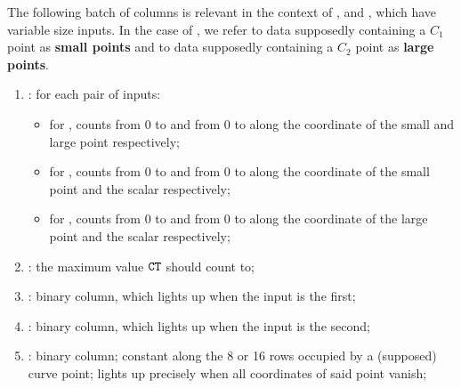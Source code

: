 The following batch of columns is relevant in the context of ,  and , which have variable size inputs.
In the case of , we refer to data supposedly containing a $C_1$ point as \textbf{small points} and to data supposedly containing a $C_2$ point as \textbf{large points}.
\begin{enumerate}[resume]
      \item \ct:
            for each pair of inputs:
            \begin{itemize}
                  \item for , counts from 0 to \ctMaxSmallPoint{} and from 0 to \ctMaxLargePoint{} along the coordinate of the small and large point respectively;
                  \item for , counts from 0 to \ctMaxSmallPoint{} and from 0 to \ctMaxScalar{} along the coordinate of the small point and the scalar respectively;
                  \item for , counts from 0 to \ctMaxLargePoint{} and from 0 to \ctMaxScalar{} along the coordinate of the large point and the scalar respectively;
            \end{itemize}
      \item \maxCt:
            the maximum value $\texttt{CT}$ should count to;
      \item \isFirstInput:
            binary column, which lights up when the input is the first;
      \item \isSecondInput:
            binary column, which lights up when the input is the second;
      \item \isInfinity:
            binary column;
            constant along the 8 or 16 rows occupied by a (supposed) curve point;
            lights up precisely when all coordinates of said point vanish;


\end{enumerate}
